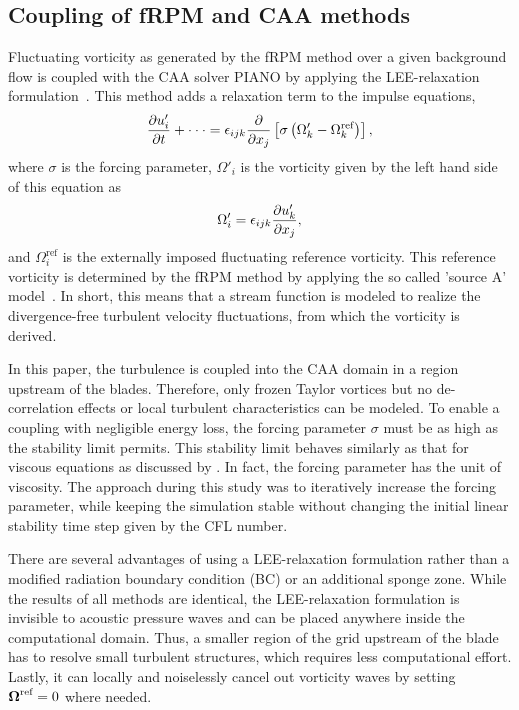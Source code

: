 \subsection{Coupling of fRPM and CAA methods}
\label{sec:coupling}
Fluctuating vorticity as generated by the fRPM method over a given background flow is coupled with the CAA solver PIANO by applying the LEE-relaxation formulation~\cite{ewert_linear-_2014}. This method adds a relaxation term to the impulse equations,
\begin{align}
\frac{\partial u'_i}{\partial t} + \cdot\cdot\cdot = \epsilon_{ijk}\frac{\partial }{\partial x_j}\left[\sigma\left(\Omega'_k -\Omega^\text{ref}_k\right)\right],
\end{align}
where $\sigma$ is the forcing parameter, $\Omega'_i$ is the vorticity given by the left hand side of this equation as
\begin{align}
\Omega'_i = \epsilon_{ijk}\frac{\partial u'_k}{\partial x_j},
\end{align}
and $\Omega^\text{ref}_i$ is the externally imposed fluctuating reference vorticity. This reference vorticity is determined by the fRPM method by applying the so called 'source A' model~\cite{ewert_caa_2011}. In short, this means that a stream function is modeled to realize the divergence-free turbulent velocity fluctuations, from which the vorticity is derived.

In this paper, the turbulence is coupled into the CAA domain in a region upstream of the blades. Therefore, only frozen Taylor vortices but no de-correlation effects or local turbulent characteristics can be modeled. To enable a coupling with negligible energy loss, the forcing parameter $\sigma$ must be as high as the stability limit permits. This stability limit behaves similarly as that for viscous equations as discussed by \cite{moghadam_implementation_2012}. In fact, the forcing parameter has the unit of viscosity. The approach during this study was to iteratively increase the forcing parameter, while keeping the simulation stable without changing the initial linear stability time step given by the CFL number.   
 
There are several advantages of using a LEE-relaxation formulation rather than a modified \citet{tam_radiation_1996} radiation boundary condition (BC) or an additional sponge zone.  While the results of all methods are identical, the LEE-relaxation formulation is invisible to acoustic pressure waves and can be placed anywhere inside the computational domain.  Thus, a smaller region of the grid upstream of the blade has to resolve small turbulent structures, which requires less computational effort. Lastly, it can locally and noiselessly cancel out vorticity waves by setting $\boldsymbol{\Omega}^\text{ref} = 0$ where needed.
 
